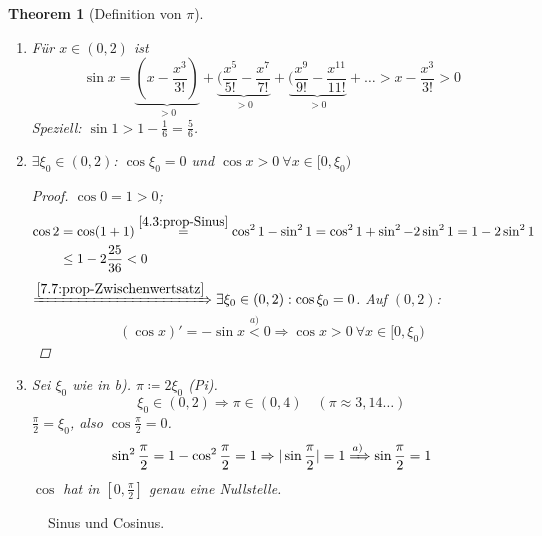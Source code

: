 \documentclass[14pt,titlepage,ngerman,a4paper,headsepline,DIV15,halfparskip*]{scrartcl}
\theoremstyle{named}
\newtheorem{namedtheorem}{Theorem} \counterwithin{namedtheorem}{section}
\theoremstyle{dotless}
\begin{document}
\begin{namedtheorem}[Definition von $\pi$] ~\ \label{9.14:prop-DefPi}
	\begin{enumerate}
		\item Für $x \in (0, 2)$ ist
			$$ \sin x = \underbrace{(x - \frac{x^{3}}{3!})}_{> 0} + \underbrace{(\frac{x^{5}}{5!} - \frac{x^{7}}{7!}}_{> 0} + \underbrace{(\frac{x^{9}}{9!} - \frac{x^{11}}{11!}}_{> 0} + \dotsc > x - \frac{x^{3}}{3!} > 0 $$
			Speziell: $\sin 1 > 1 - \frac{1}{6} = \frac{5}{6}$.
		\item $\exists \xi_{0} \in (0, 2)$: $\cos \xi_{0} = 0$ und $\cos x > 0 ~\forall x \in [0, \xi_{0})$
		\begin{proof}
			$\cos 0 = 1 > 0$; 
			\begin{align*}
				\cos 2 & = \cos (1 + 1) \overset{\ref{4.3:prop-Sinus}}{=} \cos^{2} 1 - \sin^{2} 1 = \cos^{2} 1 + \sin^{2} - 2 \sin^{2} 1 = 1 - 2 \sin^{2} 1 \\
					& \leq 1 - 2 \frac{25}{36} < 0
			\end{align*} 
			$\xRightarrow[]{\ref{7.7:prop-Zwischenwertsatz}} \exists \xi_{0} \in (0, 2): \cos \xi_{0} = 0$. Auf $(0, 2)$:
			$$ (\cos x)' = - \sin x \overset{a)}< 0 \Rightarrow \cos x > 0 ~\forall x \in [0, \xi_{0}) $$
		\end{proof}
		\item Sei $\xi_{0}$ wie in b). $\pi \coloneqq 2 \xi_{0}$ (Pi). 
		$$ \xi_{0} \in (0, 2) \Rightarrow \pi \in (0, 4) \quad (\pi \approx 3,14\dotsc) $$
		$\frac{\pi}{2} = \xi_{0}$, also $\cos \frac{\pi}{2} = 0$.
		$$ \sin^{2} \frac{\pi}{2}= 1 - \cos^{2} \frac{\pi}{2} = 1 \Rightarrow | \sin \frac{\pi}{2} | = 1 \xRightarrow[]{a)} \sin \frac{\pi}{2} = 1 $$
		$\cos$ hat in $[0, \frac{\pi}{2}]$ genau eine Nullstelle.
	\end{enumerate}	 
\end{namedtheorem}


\begin{figure*}[!ht] \centering
	\caption{Sinus und Cosinus.}	
\end{figure*}
\end{document}
